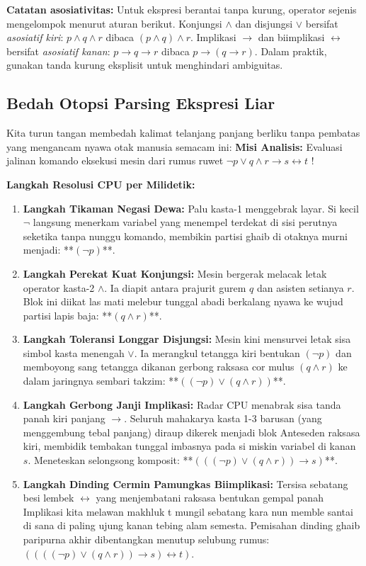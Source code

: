 \textbf{Catatan asosiativitas:} Untuk ekspresi berantai tanpa kurung, operator sejenis mengelompok menurut aturan berikut. Konjungsi $\wedge$ dan disjungsi $\vee$ bersifat \textit{asosiatif kiri}: $p \wedge q \wedge r$ dibaca $(p \wedge q) \wedge r$. Implikasi $\rightarrow$ dan biimplikasi $\leftrightarrow$ bersifat \textit{asosiatif kanan}: $p \rightarrow q \rightarrow r$ dibaca $p \rightarrow (q \rightarrow r)$. Dalam praktik, gunakan tanda kurung eksplisit untuk menghindari ambiguitas.

\subsection{Bedah Otopsi Parsing Ekspresi Liar}

Kita turun tangan membedah kalimat telanjang panjang berliku tanpa pembatas yang mengancam nyawa otak manusia semacam ini:
\textbf{Misi Analisis:} Evaluasi jalinan komando eksekusi mesin dari rumus ruwet $\neg p \vee q \wedge r \rightarrow s \leftrightarrow t$ !

\textbf{Langkah Resolusi CPU per Milidetik:}
\begin{enumerate}
    \item \textbf{Langkah Tikaman Negasi Dewa:} Palu kasta-1 menggebrak layar. Si kecil $\neg$ langsung menerkam variabel yang menempel terdekat di sisi perutnya seketika tanpa nunggu komando, membikin partisi ghaib di otaknya murni menjadi: **$(\neg p)$**.
    \item \textbf{Langkah Perekat Kuat Konjungsi:} Mesin bergerak melacak letak operator kasta-2 $\wedge$. Ia diapit antara prajurit gurem $q$ dan asisten setianya $r$. Blok ini diikat las mati melebur tunggal abadi berkalang nyawa ke wujud partisi lapis baja: **$(q \wedge r)$**.
    \item \textbf{Langkah Toleransi Longgar Disjungsi:} Mesin kini mensurvei letak sisa simbol kasta menengah $\vee$. Ia merangkul tetangga kiri bentukan $(\neg p)$ dan memboyong sang tetangga dikanan gerbong raksasa cor mulus $(q \wedge r)$ ke dalam jaringnya sembari takzim: **$( (\neg p) \vee (q \wedge r) )$**.
    \item \textbf{Langkah Gerbong Janji Implikasi:} Radar CPU menabrak sisa tanda panah kiri panjang $\rightarrow$. Seluruh mahakarya kasta 1-3 barusan (yang menggembung tebal panjang) diraup dikerek menjadi blok Anteseden raksasa kiri, membidik tembakan tunggal imbasnya pada si miskin variabel di kanan $s$. Meneteskan selongsong komposit: **$(( (\neg p) \vee (q \wedge r) ) \rightarrow s)$**.
    \item \textbf{Langkah Dinding Cermin Pamungkas Biimplikasi:} Tersisa sebatang besi lembek $\leftrightarrow$ yang menjembatani raksasa bentukan gempal panah Implikasi kita melawan makhluk t mungil sebatang kara nun memble santai di sana di paling ujung kanan tebing alam semesta. Pemisahan dinding ghaib paripurna akhir dibentangkan menutup selubung rumus: \textbf{$((( (\neg p) \vee (q \wedge r) ) \rightarrow s) \leftrightarrow t)$}. 
\end{enumerate}

